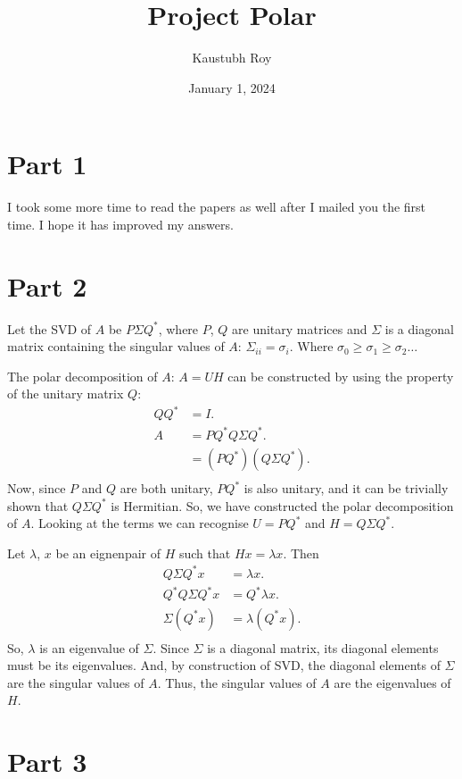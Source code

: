 \documentclass{article}
\date{January 1, 2024}
\title{Project Polar}
\author{Kaustubh Roy}
\begin{document}
\maketitle

\section{Part 1}
I took some more time to read the papers as well after I mailed you the first time. I hope it has improved my answers.

\section{Part 2}
\begin{flushleft}

Let the SVD of $A$ be $P\Sigma Q^*$, where $P$, $Q$ are unitary matrices and $\Sigma$ is a diagonal matrix containing the singular values of $A$: $\Sigma_{ii} = \sigma_{i}$. Where $\sigma_0 \geq \sigma_1 \geq \sigma_2 \dots$

The polar decomposition of $A$: $A = UH$ can be constructed by using the property of the unitary matrix $Q$:
\begin{align*}
    QQ^* &= I.\\
    A &= P Q^* Q \Sigma Q^*.\\
    &= (P Q^*) (Q \Sigma Q^*).\\
\end{align*}
Now, since $P$ and $Q$ are both unitary, $P Q^*$ is also unitary, and it can be trivially shown that $Q \Sigma Q^*$ is Hermitian. So, we have constructed the polar decomposition of $A$.
Looking at the terms we can recognise $U = PQ^*$ and $H=Q \Sigma Q^*$.

Let $\lambda$, $x$ be an eignenpair of $H$ such that $Hx=\lambda x$. Then
\begin{align*}
    Q \Sigma Q^* x &= \lambda x .\\
    Q^* Q \Sigma Q^* x &= Q^* \lambda x .\\
    \Sigma (Q^* x) &= \lambda (Q^* x).\\
\end{align*}
So, $\lambda$ is an eigenvalue of $\Sigma$. Since $\Sigma $ is a diagonal matrix, its diagonal elements must be its eigenvalues. And, by construction of SVD, the diagonal elements of $\Sigma$ are the singular values of $A$. Thus, the singular values of $A$ are the eigenvalues of $H$.
\end{flushleft}
\newpage
\section{Part 3}
\end{document}
